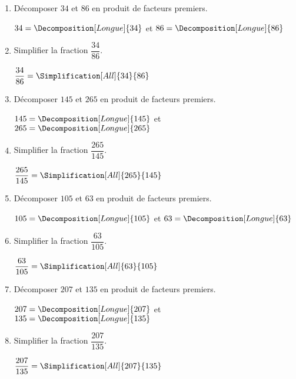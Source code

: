 \begin{corrige}
    \begin{spacing}{1.5}
        \begin{enumerate}
            \item Décomposer $34$ et $86$ en produit de facteurs premiers.
            
            {\red $34 = \Decomposition[Longue]{34}$ et $86 = \Decomposition[Longue]{86}$}
            \item Simplifier la fraction $\dfrac{34}{86}$.
            
            {\red $\dfrac{34}{86} = \displaystyle\Simplification[All]{34}{86}$}
            \item Décomposer $145$ et $265$ en produit de facteurs premiers.
            
            {\red $145 = \Decomposition[Longue]{145}$ et $265 = \Decomposition[Longue]{265}$}
            \item Simplifier la fraction $\dfrac{265}{145}$.
            
            {\red $\dfrac{265}{145} = \displaystyle\Simplification[All]{265}{145}$}
            \item Décomposer $105$ et $63$ en produit de facteurs premiers.
            
            {\red $105 = \Decomposition[Longue]{105}$ et $63 = \Decomposition[Longue]{63}$}
            \item Simplifier la fraction $\dfrac{63}{105}$.
            
            {\red $\dfrac{63}{105} = \displaystyle\Simplification[All]{63}{105}$}
            \item Décomposer $207$ et $135$ en produit de facteurs premiers.
            
            {\red $207 = \Decomposition[Longue]{207}$ et $135 = \Decomposition[Longue]{135}$}
            \item Simplifier la fraction $\dfrac{207}{135}$.
            
            {\red $\dfrac{207}{135} = \displaystyle\Simplification[All]{207}{135}$}
        \end{enumerate}                   
    \end{spacing}
\end{corrige}

